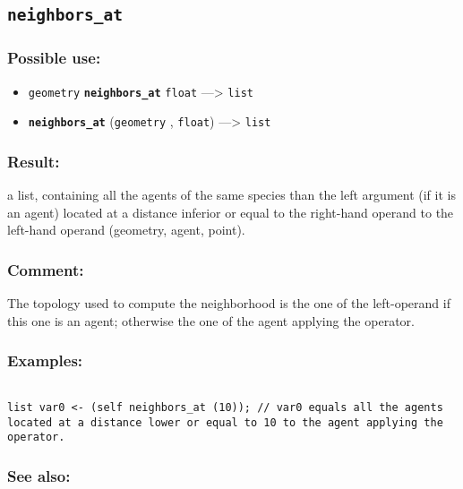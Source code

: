 \documentclass[]{book}
\providecommand{\tightlist}{%
  \setlength{\itemsep}{0pt}\setlength{\parskip}{0pt}}
\theoremstyle{definition}
\theoremstyle{definition}
\theoremstyle{definition}
\theoremstyle{remark}
\begin{document}
\subsection{\texorpdfstring{\texttt{neighbors\_at}}{neighbors\_at}}\label{neighbors_at}

\subsubsection{Possible use:}\label{possible-use-366}

\begin{itemize}
\tightlist
\item
  \texttt{geometry} \textbf{\texttt{neighbors\_at}} \texttt{float}
  ---\textgreater{} \texttt{list}
\item
  \textbf{\texttt{neighbors\_at}} (\texttt{geometry} , \texttt{float})
  ---\textgreater{} \texttt{list}
\end{itemize}

\subsubsection{Result:}\label{result-354}

a list, containing all the agents of the same species than the left
argument (if it is an agent) located at a distance inferior or equal to
the right-hand operand to the left-hand operand (geometry, agent,
point).

\subsubsection{Comment:}\label{comment-73}

The topology used to compute the neighborhood is the one of the
left-operand if this one is an agent; otherwise the one of the agent
applying the operator.

\subsubsection{Examples:}\label{examples-253}

\begin{verbatim}
 
list var0 <- (self neighbors_at (10)); // var0 equals all the agents located at a distance lower or equal to 10 to the agent applying the operator.
\end{verbatim}

\subsubsection{See also:}\label{see-also-146}
\end{document}
